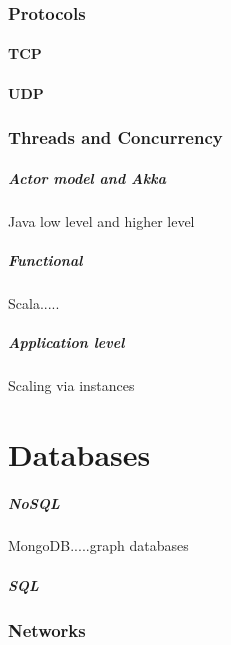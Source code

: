 \documentclass[a4paper, 11pt]{book}
\begin{document}
    \subsection{Protocols}

    \subsubsection{TCP}

    \subsubsection{UDP}

    \subsection{Threads and Concurrency}

    \paragraph{Actor model and Akka}
    Java low level and higher level

    \paragraph{Functional}
    Scala.....

    \paragraph{Application level}
    Scaling via instances

    \chapter{Databases}

    \paragraph{NoSQL}
    MongoDB.....graph databases

    \paragraph{SQL}

    \subsection{Networks}
\end{document}
